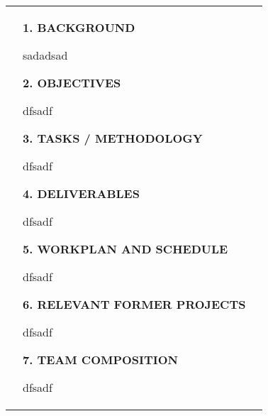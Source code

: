 \newpage\noindent \ \\ [-2cm]
\begin{minipage}{\textwidth}
\begin{tabular}{@{}
p{}
p{}
p{}
}
& \textcolor{black!45!\thecolour}{\textbf{1. BACKGROUND}} \par \smallskip   sadadsad  \par \bigskip \textcolor{black!45!\thecolour}{\textbf{2. OBJECTIVES}} \par\smallskip
dfsadf  
\par \bigskip \textcolor{black!45!\thecolour}{\textbf{3. TASKS / METHODOLOGY}} \par\smallskip
dfsadf  
\par \bigskip \textcolor{black!45!\thecolour}{\textbf{4. DELIVERABLES}} \par\smallskip
dfsadf  
\par \bigskip \textcolor{black!45!\thecolour}{\textbf{5. WORKPLAN AND SCHEDULE}} \par\smallskip
dfsadf  
\par \bigskip \textcolor{black!45!\thecolour}{\textbf{6. RELEVANT FORMER PROJECTS}} \par\smallskip
dfsadf 
\par \bigskip \textcolor{black!45!\thecolour}{\textbf{7. TEAM COMPOSITION}} \par\smallskip
dfsadf &\\
\end{tabular} \\[-0.35cm] 
\end{minipage}
\thispagestyle{fancy}
\lhead{}
\rhead{}
\chead{}
